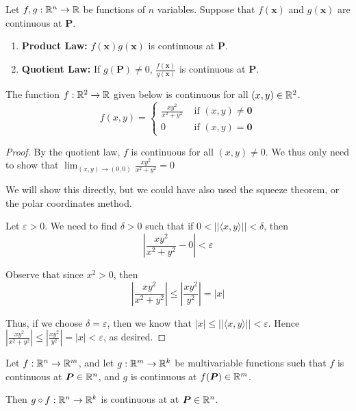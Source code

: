 \begin{theorem}\label{sumscalarmultcont}
     Let $f,g : \mathbb{R}^n \to \mathbb{R}$ be functions of $n$ variables. Suppose that $f(\bm{x})$ and $g(\bm{x})$ are continuous at $\bm{P}$.
    
    \begin{enumerate}
        \item \textbf{Product Law:} $f(\bm{x})g(\bm{x})$ is continuous at $\bm{P}$.
        \item \textbf{Quotient Law:} If $g(\bm{P})\neq 0$, $\frac{f(\bm{x})}{g(\bm{x})}$  is continuous at $\bm{P}$.
    \end{enumerate}
    
    
    \end{theorem}

    \begin{example}
    The function $f: \mathbb{R}^2 \to \mathbb{R}$ given below is continuous for all $(x,y) \in \mathbb{R}^2$. $$f(x,y) = \left\{
		\begin{array}{ll}
			\frac{xy^2}{x^2 + y^2} & \text{ if } (x,y) \neq \bm{0} \\
			0 & \text{ if } (x,y) = \bm{0}
		\end{array}
		\right.$$
		
	\begin{proof}
	By the quotient law, $f$ is continuous for all $(x,y) \neq 0$.  We thus only need to show that $\lim_{(x,y) \to (0,0)} \frac{xy^2}{x^2 + y^2} = 0$
	
	We will show this directly, but we could have also used the squeeze theorem, or the polar coordinates method.
	
	Let $\varepsilon > 0$.  We need to find $\delta > 0$ such that if $0 < ||\langle x, y \rangle|| < \delta$, then $$|\frac{xy^2}{x^2 + y^2} - 0| < \varepsilon$$
	
	Observe that since $x^2 > 0$, then $$|\frac{xy^2}{x^2 + y^2}| \leq |\frac{xy^2}{y^2}| = |x|$$
	
	Thus, if we choose $\delta = \varepsilon$, then we know that $|x| \leq ||\langle x, y \rangle|| < \varepsilon$.  Hence $|\frac{xy^2}{x^2 + y^2}| \leq |\frac{xy^2}{y^2}| = |x| < \varepsilon$, as desired.
	
	\end{proof}
		
    \end{example}

    \begin{theorem}
    Let $f : \mathbb{R}^n \to \mathbb{R}^m$, and let $g: \mathbb{R}^m \to \mathbb{R}^k$ be multivariable functions such that $f$ is continuous at $\bm{P} \in \mathbb{R}^n$, and $g$ is continuous at $f(\bm{P}) \in \mathbb{R}^m$.
    
    \vspace{1em}
    Then $g \circ f : \mathbb{R}^n \to \mathbb{R}^k$ is continuous at at $\bm{P} \in \mathbb{R}^n$.
    \end{theorem}
    
